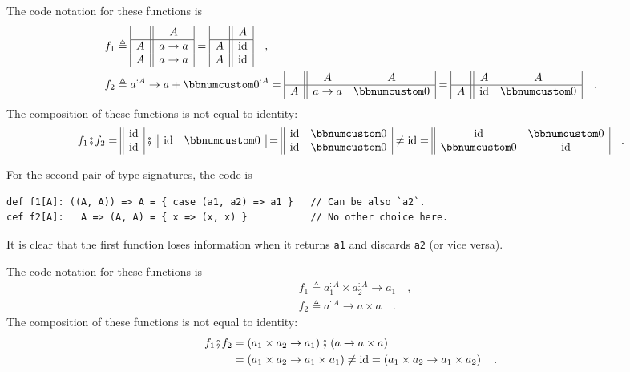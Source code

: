 The code notation for these functions is
\begin{align*}
 & f_{1}\triangleq\begin{array}{|c||c|}
 & A\\
\hline A & a\rightarrow a\\
A & a\rightarrow a
\end{array}=\begin{array}{|c||c|}
 & A\\
\hline A & \text{id}\\
A & \text{id}
\end{array}\quad,\\
 & f_{2}\triangleq a^{:A}\rightarrow a+\bbnum 0^{:A}=\begin{array}{|c||cc|}
 & A & A\\
\hline A & a\rightarrow a & \bbnum 0
\end{array}=\begin{array}{|c||cc|}
 & A & A\\
\hline A & \text{id} & \bbnum 0
\end{array}\quad.
\end{align*}
The composition of these functions is not equal to identity:
\[
f_{1}\bef f_{2}=\begin{array}{||c|}
\text{id}\\
\text{id}
\end{array}\,\bef\,\begin{array}{||cc|}
\text{id} & \bbnum 0\end{array}=\begin{array}{||cc|}
\text{id} & \bbnum 0\\
\text{id} & \bbnum 0
\end{array}\neq\text{id}=\begin{array}{||cc|}
\text{id} & \bbnum 0\\
\bbnum 0 & \text{id}
\end{array}\quad.
\]

For the second pair of type signatures, the code is
\begin{lstlisting}
def f1[A]: ((A, A)) => A = { case (a1, a2) => a1 }   // Can be also `a2`.
cef f2[A]:   A => (A, A) = { x => (x, x) }           // No other choice here.
\end{lstlisting}
It is clear that the first function loses information when it returns
\lstinline!a1! and discards \lstinline!a2! (or vice versa).

The code notation for these functions is
\begin{align*}
 & f_{1}\triangleq a_{1}^{:A}\times a_{2}^{:A}\rightarrow a_{1}\quad,\\
 & f_{2}\triangleq a^{:A}\rightarrow a\times a\quad.
\end{align*}
The composition of these functions is not equal to identity:
\begin{align*}
f_{1}\bef f_{2} & =\left(a_{1}\times a_{2}\rightarrow a_{1}\right)\bef\left(a\rightarrow a\times a\right)\\
 & =\left(a_{1}\times a_{2}\rightarrow a_{1}\times a_{1}\right)\neq\text{id}=\left(a_{1}\times a_{2}\rightarrow a_{1}\times a_{2}\right)\quad.
\end{align*}

